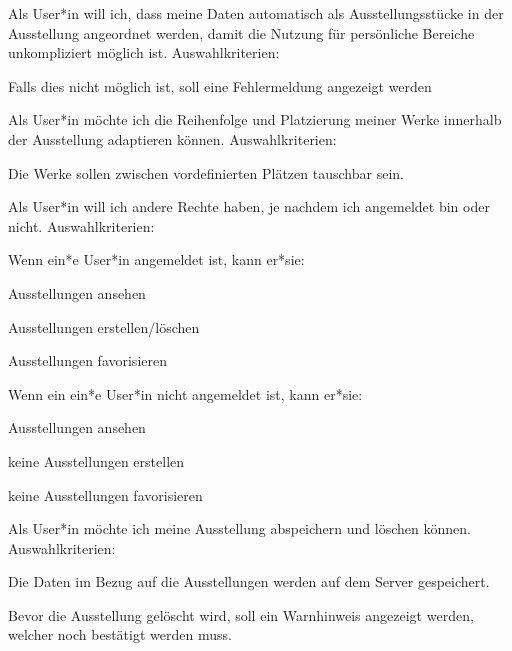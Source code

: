 \begin{compactenum}
\begin{compactitem}
    \end{compactitem} 
    \item  Als User*in will ich, dass meine Daten automatisch als Ausstellungsstücke in der Ausstellung angeordnet werden, damit die Nutzung für persönliche Bereiche unkompliziert möglich ist. Auswahlkriterien: 
    \begin{compactitem}
        \item Falls dies nicht möglich ist, soll eine Fehlermeldung angezeigt werden
    \end{compactitem} 
    \item Als User*in möchte ich die Reihenfolge und Platzierung meiner Werke innerhalb der Ausstellung adaptieren können. Auswahlkriterien: 
    \begin{compactitem}
        \item Die Werke sollen zwischen vordefinierten Plätzen tauschbar sein.
    \end{compactitem} 
    \item Als User*in will ich andere Rechte haben, je nachdem ich angemeldet bin oder nicht. Auswahlkriterien: 
    \begin{compactitem}
        \item Wenn ein*e User*in angemeldet ist, kann er*sie:
        \begin{compactitem}
            \item Ausstellungen ansehen 
            \item Ausstellungen erstellen/löschen 
            \item Ausstellungen favorisieren
        \end{compactitem}  
        \item Wenn ein ein*e User*in nicht angemeldet ist, kann er*sie: 
        \begin{compactitem}
            \item Ausstellungen ansehen 
            \item keine Ausstellungen erstellen 
            \item keine Ausstellungen favorisieren
        \end{compactitem} 
    \end{compactitem} 
    \item Als User*in möchte ich meine Ausstellung abspeichern und löschen können. Auswahlkriterien: 
    \begin{compactitem}
        \item Die Daten im Bezug auf die Ausstellungen werden auf dem Server gespeichert.
        \item Bevor die Ausstellung gelöscht wird, soll ein Warnhinweis angezeigt werden, welcher noch bestätigt werden muss. 
    \end{compactitem} 
\end{compactenum}

